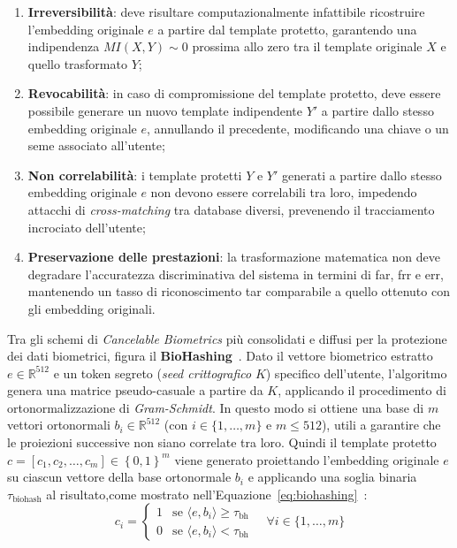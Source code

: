 \begin{enumerate}
    \item \textbf{Irreversibilità}: deve risultare computazionalmente infattibile ricostruire l'embedding originale $e$ a partire dal template protetto, garantendo una indipendenza $MI(X,Y)\sim0$ prossima allo zero tra il template originale $X$ e quello trasformato $Y$;
    \item \textbf{Revocabilità}: in caso di compromissione del template protetto, deve essere possibile generare un nuovo template indipendente $Y'$ a partire dallo stesso embedding originale $e$, annullando il precedente, modificando una chiave o un seme associato all'utente;
    \item \textbf{Non correlabilità}: i template protetti $Y$ e $Y'$ generati a partire dallo stesso embedding originale $e$ non devono essere correlabili tra loro, impedendo attacchi di \textit{cross-matching} tra database diversi, prevenendo il tracciamento incrociato dell'utente;
    \item \textbf{Preservazione delle prestazioni}: la trasformazione matematica non deve degradare l'accuratezza discriminativa del sistema in termini di \gls{far}, \gls{frr} e \gls{err}, mantenendo un tasso di riconoscimento \gls{tar} comparabile a quello ottenuto con gli embedding originali.
\end{enumerate}
Tra gli schemi di \textit{Cancelable Biometrics} più consolidati e diffusi per la protezione dei dati biometrici, figura il \textbf{BioHashing}~\cite{otroshishahrezaBenchmarkingCancelableBiometrics2022}.
Dato il vettore biometrico estratto $e \in \mathbb{R}^{512}$ e un token segreto (\textit{seed crittografico} $K$) specifico dell'utente, l'algoritmo genera una matrice pseudo-casuale a partire da $K$, applicando il procedimento di ortonormalizzazione di \textit{Gram-Schmidt}. In questo modo si ottiene una base di $m$ vettori ortonormali $b_i \in \mathbb{R}^{512}$ (con $i \in \{1, \dots, m\}$ e $m \le 512$), utili a garantire che le proiezioni successive non siano correlate tra loro.
Quindi il template protetto $c = [c_1, c_2, \dots, c_m] \in {\left\{0, 1\right\}}^m$ viene generato proiettando l'embedding originale $e$ su ciascun vettore della base ortonormale $b_i$ e applicando una soglia binaria $\tau_{\text{biohash}}$ al risultato,come mostrato nell'Equazione~\eqref{eq:biohashing}~\cite{otroshishahrezaBenchmarkingCancelableBiometrics2022}:
\begin{equation}
    \label{eq:biohashing}
    c_i = \begin{cases} 1 & \text{se } \langle e, b_i \rangle \ge \tau_{\text{bh}} \\ 0 & \text{se } \langle e, b_i \rangle < \tau_{\text{bh}} \end{cases} \quad \forall i \in \{1, \dots, m\}
\end{equation}
